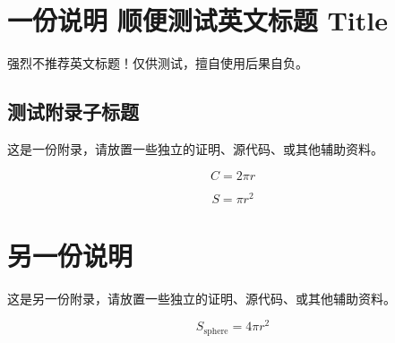 \documentclass[lang=chs, degree=phd, blindreview=false, winfonts=true]{ya-npu/yanputhesis}
\theoremstyle{plain}%
\theoremstyle{remark}%
\begin{document}
\cleardoublepage
\appendix
\chapter{一份说明 顺便测试英文标题 Title}

强烈不推荐英文标题！仅供测试，擅自使用后果自负。

\section{测试附录子标题}

这是一份附录，请放置一些独立的证明、源代码、或其他辅助资料。


\begin{equation}
    C = 2 \pi r
\end{equation}

\begin{equation}
    S = \pi r^2
\end{equation}

\cleardoublepage

\chapter{另一份说明}

这是另一份附录，请放置一些独立的证明、源代码、或其他辅助资料。


\begin{equation}
    S_{\text{sphere}} = 4 \pi r^2
\end{equation}
\end{document}
